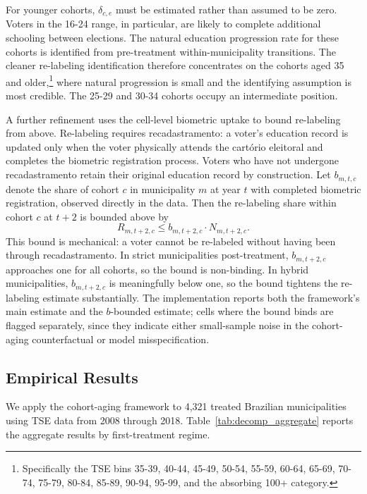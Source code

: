 For younger cohorts, $\delta_{c,e}$ must be estimated rather than assumed to be zero. Voters in the 16-24 range, in particular, are likely to complete additional schooling between elections. The natural education progression rate for these cohorts is identified from pre-treatment within-municipality transitions. The cleaner re-labeling identification therefore concentrates on the cohorts aged 35 and older,\footnote{Specifically the TSE bins 35-39, 40-44, 45-49, 50-54, 55-59, 60-64, 65-69, 70-74, 75-79, 80-84, 85-89, 90-94, 95-99, and the absorbing 100+ category.} where natural progression is small and the identifying assumption is most credible. The 25-29 and 30-34 cohorts occupy an intermediate position.

A further refinement uses the cell-level biometric uptake to bound re-labeling from above. Re-labeling requires recadastramento: a voter's education record is updated only when the voter physically attends the cartório eleitoral and completes the biometric registration process. Voters who have not undergone recadastramento retain their original education record by construction. Let $b_{m,t,c}$ denote the share of cohort $c$ in municipality $m$ at year $t$ with completed biometric registration, observed directly in the data. Then the re-labeling share within cohort $c$ at $t+2$ is bounded above by
\begin{equation}
R_{m,t+2,c} \leq b_{m,t+2,c} \cdot N_{m,t+2,c}.
\label{eq:relabel_pctbvr_bound}
\end{equation}
This bound is mechanical: a voter cannot be re-labeled without having been through recadastramento. In strict municipalities post-treatment, $b_{m,t+2,c}$ approaches one for all cohorts, so the bound is non-binding. In hybrid municipalities, $b_{m,t+2,c}$ is meaningfully below one, so the bound tightens the re-labeling estimate substantially. The implementation reports both the framework's main estimate and the $b$-bounded estimate; cells where the bound binds are flagged separately, since they indicate either small-sample noise in the cohort-aging counterfactual or model misspecification.

\subsection{Empirical Results}
\label{ssec:decomposition_results}

We apply the cohort-aging framework to 4{,}321 treated Brazilian municipalities using TSE data from 2008 through 2018. Table~\ref{tab:decomp_aggregate} reports the aggregate results by first-treatment regime.

